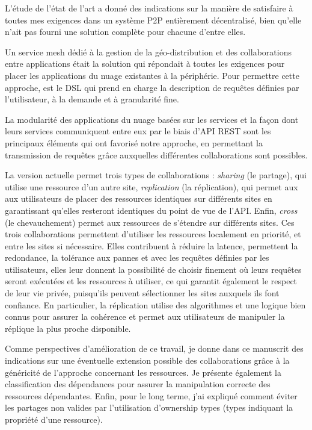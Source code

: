 L'étude de l'état de l'art a donné des indications sur la manière de
satisfaire à toutes mes exigences dans un système P2P entièrement
décentralisé, bien qu'elle n'ait pas fourni une solution complète pour
chacune d'entre elles.

Un service mesh dédié à la gestion de la géo-distribution et des
collaborations entre applications était la solution qui répondait à
toutes les exigences pour placer les applications du nuage existantes
à la périphérie.
%
Pour permettre cette approche, \scl est le DSL qui prend en charge la
description de requêtes définies par l'utilisateur, à la demande et à
granularité fine.
%

La modularité des applications du nuage basées sur les services et la
façon dont leurs services communiquent entre eux par le biais d'API
REST sont les principaux éléments qui ont favorisé notre approche, en
permettant la transmission de requêtes grâce auxquelles différentes
collaborations sont possibles.


La version actuelle permet trois types de collaborations :
\emph{sharing} (le partage), qui utilise une ressource d'un autre
site, \emph{replication} (la réplication), qui permet aux aux
utilisateurs de placer des ressources identiques sur différents sites
en garantissant qu'elles resteront identiques du point de vue de
l'API. Enfin, \emph{cross} (le chevauchement) permet aux ressources de
s'étendre sur différents sites.
%
Ces trois collaborations permettent d'utiliser les ressources
localement en priorité, et entre les sites si nécessaire.
%
Elles contribuent à réduire la latence, permettent la redondance, la
tolérance aux pannes et avec les requêtes définies par les
utilisateurs, elles leur donnent la possibilité de choisir finement où
leurs requêtes seront exécutées et les ressources à utiliser, ce qui
garantit également le respect de leur vie privée, puisqu'ils peuvent
sélectionner les sites auxquels ils font confiance.
%
En particulier, la réplication utilise des algorithmes et une logique
bien connus pour assurer la cohérence et permet aux utilisateurs de
manipuler la réplique la plus proche disponible.

Comme perspectives d'amélioration de ce travail, je donne dans ce
manuscrit des indications sur une éventuelle extension possible des
collaborations grâce à la généricité de l'approche concernant les
ressources.
%
Je présente également la classification des dépendances pour assurer
la manipulation correcte des ressources dépendantes.
%
Enfin, pour le long terme, j'ai expliqué comment éviter les partages
non valides par l'utilisation d'ownership types (types indiquant la
propriété d'une ressource).
